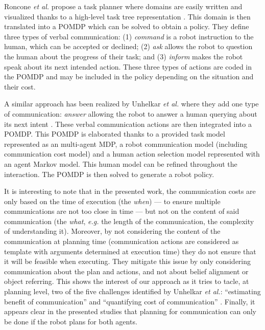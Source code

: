 \documentclass[a4paper,11pt,twoside]{StyleThese}
\begin{document}
Roncone \textit{et al.} propose a task planner where domains are easily written and visualized thanks to a high-level task tree representation \cite{roncone2017transparent}. This domain is then translated into a POMDP which can be solved to obtain a policy. They define three types of verbal communication: (1) \textit{command} is a robot instruction to the human, which can be accepted or declined; (2) \textit{ask} allows the robot to question the human about the progress of their task; and (3) \textit{inform} makes the robot speak about its next intended action. These three types of actions are coded in the POMDP and may be included in the policy depending on the situation and their cost.

A similar approach has been realized by Unhelkar \textit{et al.} where they add one type of communication: \textit{answer} allowing the robot to answer a human querying about its next intent \cite{unhelkar2020decision}. These verbal communication actions are then integrated into a POMDP. This POMDP is elaborated thanks to a provided task model represented as an multi-agent MDP, a robot communication model (including communication cost model) and a human action selection model represented with an agent Markov model. This human model can be refined throughout the interaction. The POMDP is then solved to generate a robot policy.

It is interesting to note that in the presented work, the communication costs are only based on the time of execution (the \textit{when}) --- to ensure multiple communications are not too close in time --- but not on the content of said communication (the \textit{what}, \textit{e.g.} the length of the communication, the complexity of understanding it). Moreover, by not considering the content of the communication at planning time (communication actions are considered as template with arguments determined at execution time) they do not ensure that it will be feasible when executing. They mitigate this issue by only considering communication about the plan and actions, and not about belief alignment or object referring. This shows the interest of our approach as it tries to tacle, at planning level, two of the five challenges identified by Unhelkar \textit{et al.}: ``estimating benefit of communication'' and ``quantifying cost of communication'' \cite{unhelkar2017challenges}.
Finally, it appears clear in the presented studies that planning for communication can only be done if the robot plans for both agents.
\end{document}
